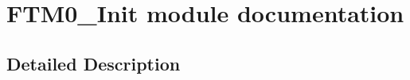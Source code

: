 \hypertarget{group___f_t_m0___init__module}{}\section{F\+T\+M0\+\_\+\+Init module documentation}
\label{group___f_t_m0___init__module}


\subsection{Detailed Description}
